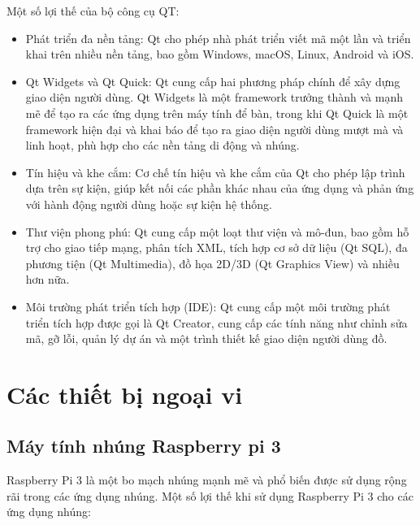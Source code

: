 \documentclass{report}
\begin{document}
Một số lợi thế của bộ công cụ QT:
\begin{itemize}
	\item Phát triển đa nền tảng: Qt cho phép nhà phát triển viết mã một lần và triển khai trên nhiều nền tảng, bao gồm Windows, macOS, Linux, Android và iOS.
	
	\item Qt Widgets và Qt Quick: Qt cung cấp hai phương pháp chính để xây dựng giao diện người dùng. Qt Widgets là một framework trưởng thành và mạnh mẽ để tạo ra các ứng dụng trên máy tính để bàn, trong khi Qt Quick là một framework hiện đại và khai báo để tạo ra giao diện người dùng mượt mà và linh hoạt, phù hợp cho các nền tảng di động và nhúng.
	
	\item Tín hiệu và khe cắm: Cơ chế tín hiệu và khe cắm của Qt cho phép lập trình dựa trên sự kiện, giúp kết nối các phần khác nhau của ứng dụng và phản ứng với hành động người dùng hoặc sự kiện hệ thống.
	
	\item Thư viện phong phú: Qt cung cấp một loạt thư viện và mô-đun, bao gồm hỗ trợ cho giao tiếp mạng, phân tích XML, tích hợp cơ sở dữ liệu (Qt SQL), đa phương tiện (Qt Multimedia), đồ họa 2D/3D (Qt Graphics View) và nhiều hơn nữa.
	
	\item Môi trường phát triển tích hợp (IDE): Qt cung cấp một môi trường phát triển tích hợp được gọi là Qt Creator, cung cấp các tính năng như chỉnh sửa mã, gỡ lỗi, quản lý dự án và một trình thiết kế giao diện người dùng đồ.
\end{itemize}

\section{Các thiết bị ngoại vi}
\subsection{Máy tính nhúng Raspberry pi 3}
Raspberry Pi 3 là một bo mạch nhúng mạnh mẽ và phổ biến được sử dụng rộng rãi trong các ứng dụng nhúng. Một số lợi thế khi sử dụng Raspberry Pi 3 cho các ứng dụng nhúng:
\end{document}
